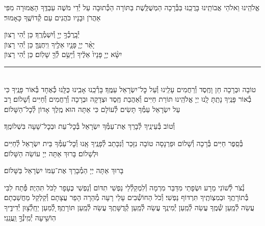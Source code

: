 \documentclass[twoside, openany, parskip=half, 11pt]{book}
\begin{document}
\retzeh

\yaalehveyavo

\zion

\modim

\alhanisim

\weekdaysahodos

אֱלֹהֵֽינוּ וֵאלֹהֵי אֲבוֹתֵֽינוּ בָּרֲכֵֽנוּ בַּבְּ֯רָכָה הַמְשֻׁלֶּֽשֶׁת בַּתּוֹרָה
הַכְּ֯תוּבָה עַל יְ֯דֵי מֹשֶׁה עַבְדֶּֽךָ הָאֲמוּרָה מִפִּי אַהֲרֹן וּבָנָיו כֹּהֲנִים עַם קְ֯דוֹשֶֽׁךָ כָּאָמוּר׃

יְ֯בָֽרֶכְ֯ךָ֥ יְיָ֖ וְ֯יִשְׁמְ֯רֶֽךָ׃ \hfill \kahal כֵּן יְ֯הִי רָצוׂן \\
יָאֵ֨ר יְיָ֧ פָּנָ֛יו אֵלֶ֖יךָ וִֽיחֻנֶּֽךָּ׃ \hfill \kahal כֵּן יְ֯הִי רָצוׂן \\
יִשָּׂ֨א יְיָ֤ פָּנָיו֙ אֵלֶ֔יךָ וְ֯יָשֵׂ֥ם לְ֯ךָ֖ שָׁלֽוֹם׃ \hfill \kahal כֵּן יְ֯הִי רָצוׂן

\rule[-0.5ex]{3in}{1pt}

\begin{paracol}{2}
\\
טוֹבָה וּבְרָכָה חֵן וָחֶֽסֶד וְ֯רַחֲמִים עָלֵֽינוּ וְ֯עַל כׇּל־יִשְׂרָאֵל עַמֶּֽךָ׃ בָּרְ֯כֵֽנוּ אָבִֽינוּ כֻּלָּֽנוּ כְּ֯אֶחָד בְּ֯אוֹר פָּנֶֽיךָ כִּי בְ֯אוֹר פָּנֶֽיךָ נָתַֽתָּ לָֽנוּ יְיָ אֱלֹהֵֽינוּ תּוֹרַת חַיִּים וְ֯אַהֲבַת חֶֽסֶד וּצְדָקָה וּבְרָכָה וְ֯רַחֲמִים וְ֯חַיִּים וְ֯שָׁלוֹם׃
\switchcolumn
{}
רָב עַל יִשְׂרָאֵל עַמְּ֯ךָ תָּשִׂים לְ֯עוֹלָם כִּי אַתָּה הוּא מֶֽלֶךְ אָדוֹן לְ֯כׇל־הַשָּׁלוֹם׃
\end{paracol}
וְ֯טוֹב בְּ֯עֵינֶֽיךָ לְ֯בָרֵךְ אֶת־עַמְּ֯ךָ יִשְׂרָאֵל בְּ֯כׇל־עֵת וּבְכׇל־שָׁעָה בִּשְׁלוֹמֶֽךָ׃


\begin{paracol}{2}
\begin{small}
בְּ֯סֵֽפֶר חַיִּים בְּ֯רָכָה וְ֯שָׁלוֹם וּפַרְנָסָה טוֹבָה נִזָּכֵר וְ֯נִכָּתֵב לְ֯פָנֶֽיךָ אָֽנוּ וְ֯כׇל־עַמְּ֯ךָ בֵּית יִשְׂרָאֵל לְ֯חַיִּים וּלְשָׁלוֹם׃ בָּרוּךְ אַתָּה יְיָ עוֹשֵׂה הַשָּׁלוֹם׃

\end{small}
\switchcolumn
בָּרוּךְ אַתָּה יְיָ הַמְ֯בָרֵךְ אֶת־עַמּוֹ יִשְׂרָאֵל בַּשָּׁלוֹם׃

\end{paracol}

נְ֯צֹר לְ֯שׁוֹנִי מֵרָע וּשְׂפָתַי מִדַּבֵּר מִרְמָה וְ֯לִמְקַלְ֯לַי נַפְשִׁי תִדּוֹם וְ֯נַפְשִׁי כֶּעָפָר לַכֹּל תִּהְיֶה׃ פְּ֯תַח לִבִּי בְּ֯תוֹרָתֶֽךָ וּבְמִצְוֹתֶֽיךָ תִּרְדּוֹף נַפְשִׁי׃ וְ֯כֹל הַחוֹשְׁ֯בִים עָלַי רָעָה מְ֯הֵרָה הָפֵר עֲצָתָם וְ֯קַלְקֵל מַחֲשַׁבְתָם׃ עֲשֵׂה לְ֯מַֽעַן שְׁ֯מֶֽךָ עֲשֵׂה לְ֯מַֽעַן יְ֯מִינֶֽךָ עֲשֵׂה לְ֯מַֽעַן קְ֯דֻשָּׁתֶֽךָ עֲשֵׂה לְ֯מַֽעַן תּוֹרָתֶֽךָ׃ לְ֭֯מַעַן יֵחָֽלְ֯צ֥וּן יְ֯דִידֶ֑יךָ הֽוֹשִׁ֖יעָה יְ֯מִֽינְ֯ךָ֣ וַֽעֲנֵֽנִי׃
\end{document}
